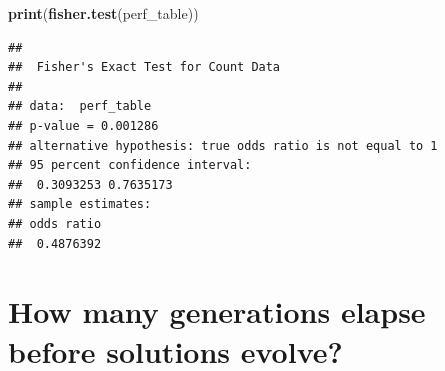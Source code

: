\documentclass[
]{book}
\newenvironment{Shaded}{\begin{snugshade}}{\end{snugshade}}
\newcommand{\KeywordTok}[1]{\textcolor[rgb]{0.13,0.29,0.53}{\textbf{#1}}}
\newcommand{\NormalTok}[1]{#1}
\begin{document}
\begin{Shaded}
\begin{Highlighting}[]
\KeywordTok{print}\NormalTok{(}\KeywordTok{fisher.test}\NormalTok{(perf\_table))}
\end{Highlighting}
\end{Shaded}

\begin{verbatim}
## 
##  Fisher's Exact Test for Count Data
## 
## data:  perf_table
## p-value = 0.001286
## alternative hypothesis: true odds ratio is not equal to 1
## 95 percent confidence interval:
##  0.3093253 0.7635173
## sample estimates:
## odds ratio 
##  0.4876392
\end{verbatim}

\hypertarget{how-many-generations-elapse-before-solutions-evolve-3}{%
\section{How many generations elapse before solutions evolve?}\label{how-many-generations-elapse-before-solutions-evolve-3}}
\end{document}
